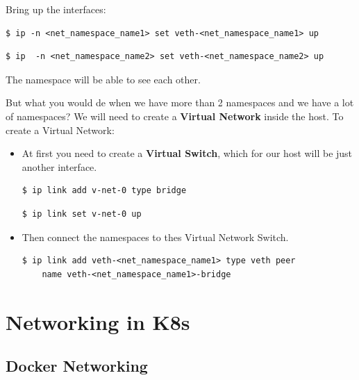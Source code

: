 \documentclass{article}
\newenvironment{codetemplate}[1][]{%
  \mybasecolorbox[#1]
  \itshape
}{%
  \endmybasecolorbox
}
\begin{document}
Bring up the interfaces:
\begin{codetemplate}{}
\begin{verbatim}
$ ip -n <net_namespace_name1> set veth-<net_namespace_name1> up
\end{verbatim}
\end{codetemplate}
\begin{codetemplate}{}
\begin{verbatim}
$ ip  -n <net_namespace_name2> set veth-<net_namespace_name2> up
\end{verbatim}
\end{codetemplate}

The namespace will be able to see each other.

But what you would de when we have more than 2 namespaces and we have a lot of namespaces? We will need to create a \textbf{Virtual Network} inside the host. To create a Virtual Network:
\begin{itemize}
    \item At first you need to create a \textbf{Virtual Switch}, which for our host will be just another interface.
\begin{codetemplate}{}
\begin{verbatim}
$ ip link add v-net-0 type bridge
\end{verbatim}
\end{codetemplate}
\begin{codetemplate}{}
\begin{verbatim}
$ ip link set v-net-0 up
\end{verbatim}
\end{codetemplate}
    \item Then connect the namespaces to thes Virtual Network Switch.
\begin{codetemplate}{}
\begin{verbatim}
$ ip link add veth-<net_namespace_name1> type veth peer 
    name veth-<net_namespace_name1>-bridge
\end{verbatim}
\end{codetemplate}
\end{itemize}

\newpage
\section{Networking in K8s}

\subsection{Docker Networking}
\end{document}
